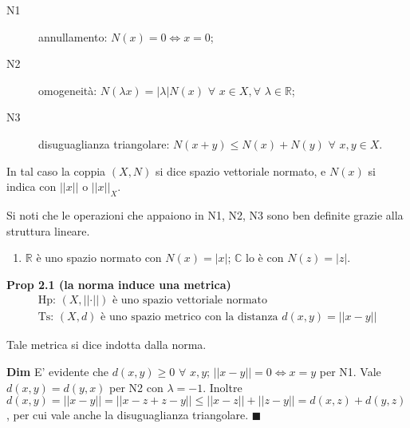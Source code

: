 \documentclass{article}
\begin{document}
\begin{description}
\item[N1] annullamento: $N\left( x\right) =0\Longleftrightarrow x=0$;

\item[N2] omogeneit\`{a}: $N\left( \lambda x\right) =\left\vert \lambda
\right\vert N\left( x\right) $ $\forall $ $x\in X,\forall $ $\lambda \in 
\mathbb{R}
$;

\item[N3] disuguaglianza triangolare: $N\left( x+y\right) \leq N\left(
x\right) +N\left( y\right) $ $\forall $ $x,y\in X$.
\end{description}

In tal caso la coppia $\left( X,N\right) $ si dice spazio vettoriale
normato, e $N\left( x\right) $ si indica con $\left\vert \left\vert
x\right\vert \right\vert $ o $\left\vert \left\vert x\right\vert \right\vert
_{X}$.

Si noti che le operazioni che appaiono in N1, N2, N3 sono ben definite
grazie alla struttura lineare.

\begin{enumerate}
\item $%
\mathbb{R}
$ \`{e} uno spazio normato con $N\left( x\right) =\left\vert x\right\vert $; 
$%
\mathbb{C}
$ lo \`{e} con $N\left( z\right) =\left\vert z\right\vert $.
\end{enumerate}

\textbf{Prop 2.1 (la norma induce una metrica)}%
\begin{gather*}
\text{Hp: }\left( X,\left\vert \left\vert \cdot \right\vert \right\vert
\right) \text{ \`{e} uno spazio vettoriale normato } \\
\text{Ts: }\left( X,d\right) \text{ \`{e} uno spazio metrico con la distanza 
}d\left( x,y\right) =\left\vert \left\vert x-y\right\vert \right\vert
\end{gather*}

Tale metrica si dice indotta dalla norma.

\textbf{Dim} E' evidente che $d\left( x,y\right) \geq 0$ $\forall $ $x,y$; $%
\left\vert \left\vert x-y\right\vert \right\vert =0\Longleftrightarrow x=y$
per N1. Vale $d\left( x,y\right) =d\left( y,x\right) $ per N2 con $\lambda
=-1$. Inoltre $d\left( x,y\right) =\left\vert \left\vert x-y\right\vert
\right\vert =\left\vert \left\vert x-z+z-y\right\vert \right\vert \leq
\left\vert \left\vert x-z\right\vert \right\vert +\left\vert \left\vert
z-y\right\vert \right\vert =d\left( x,z\right) +d\left( y,z\right) $, per
cui vale anche la disuguaglianza triangolare. $\blacksquare $
\end{document}
